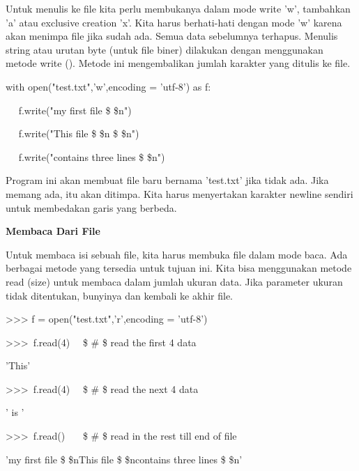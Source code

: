 Untuk menulis ke file kita perlu membukanya dalam mode write 'w', tambahkan 'a' atau exclusive creation 'x'. Kita harus berhati-hati dengan mode 'w' karena akan menimpa file jika sudah ada. Semua data sebelumnya terhapus. Menulis string atau urutan byte (untuk file biner) dilakukan dengan menggunakan metode write (). Metode ini mengembalikan jumlah karakter yang ditulis ke file. \par
\vspace{12pt}
\noindent 
with open("test.txt",'w',encoding = 'utf-8') as f: \par
\noindent 
~~ f.write("my first file \$  \setminus  \$n") \par
\noindent 
~~ f.write("This file \$  \setminus  \$n \$  \setminus  \$n") \par
\noindent 
~~ f.write("contains three lines \$  \setminus  \$n") \par
\vspace{12pt}
Program ini akan membuat file baru bernama 'test.txt' jika tidak ada. Jika memang ada, itu akan ditimpa. Kita harus menyertakan karakter newline sendiri untuk membedakan garis yang berbeda. \par
\vspace{12pt}
\noindent 
{\fontsize{14pt}{14pt}\selectfont \textbf{Membaca Dari File} \\} \par
\vspace{12pt}
Untuk membaca isi sebuah file, kita harus membuka file dalam mode baca. Ada berbagai metode yang tersedia untuk tujuan ini. Kita bisa menggunakan metode read (size) untuk membaca dalam jumlah ukuran data. Jika parameter ukuran tidak ditentukan, bunyinya dan kembali ke akhir file. \par
\vspace{12pt}
\vspace{12pt}
\noindent 
>>> f = open("test.txt",'r',encoding = 'utf-8') \par
\noindent 
>>>~f.read(4)~~   \$  \#  \$ read the first 4 data \par
\noindent 
'This' \par
\vspace{12pt}
\noindent 
>>>~f.read(4)~~   \$  \#  \$ read the next 4 data \par
\noindent 
' is ' \par
\vspace{12pt}
\noindent 
>>>~f.read()~~~   \$  \#  \$ read in the rest till end of file \par
\noindent 
'my first file \$  \setminus  \$nThis file \$  \setminus  \$ncontains three lines \$  \setminus  \$n' \par
